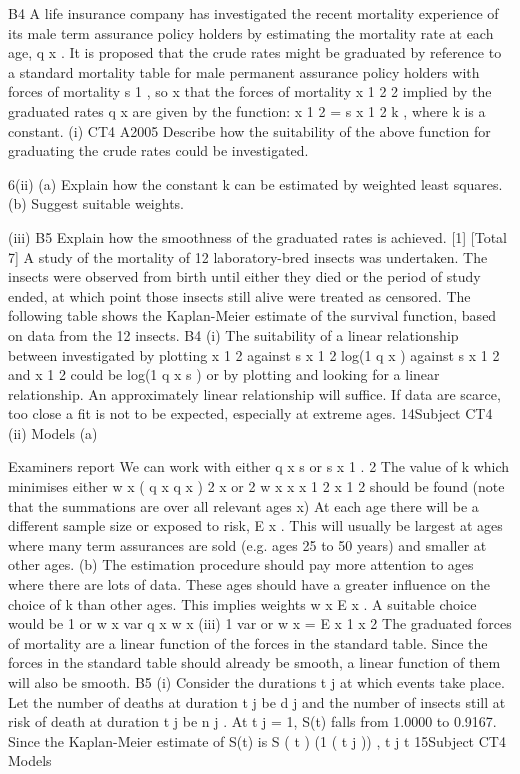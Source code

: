 \documentclass[a4paper,12pt]{article}
\begin{document}
\begin{enumerate}
B4
A life insurance company has investigated the recent mortality experience of its male
term assurance policy holders by estimating the mortality rate at each age, q x . It is
proposed that the crude rates might be graduated by reference to a standard mortality
table for male permanent assurance policy holders with forces of mortality s 1 , so
x
that the forces of mortality
x
1
2
2
implied by the graduated rates q x are given by the
function:
x
1
2
=
s
x
1
2
k ,
where k is a constant.
(i)
CT4 A2005
Describe how the suitability of the above function for graduating the crude
rates could be investigated.

6(ii)
(a) Explain how the constant k can be estimated by weighted least squares.
(b) Suggest suitable weights.

(iii)
B5
Explain how the smoothness of the graduated rates is achieved.
[1]
[Total 7]
A study of the mortality of 12 laboratory-bred insects was undertaken. The insects
were observed from birth until either they died or the period of study ended, at which
point those insects still alive were treated as censored.
The following table shows the Kaplan-Meier estimate of the survival function, based
on data from the 12 insects.
B4
(i)
The suitability of a linear relationship between
investigated by plotting
x
1
2
against
s
x
1
2
log(1 q x ) against
s
x
1
2
and
x
1
2
could be
log(1 q x s ) or by plotting
and
looking for a linear relationship.
An approximately linear relationship will suffice.
If data are scarce, too close a fit is not to be expected, especially at extreme
ages.
14Subject CT4
(ii)
Models
(a)

Examiners report
We can work with either q x s or
s
x
1 .
2
The value of k which minimises either
w x ( q x q x ) 2
x
or
2
w x
x
x
1
2
x
1
2
should be found (note that the summations are over all relevant ages x)
At each age there will be a different sample size or exposed to risk, E x .
This will usually be largest at ages where many term assurances are
sold (e.g. ages 25 to 50 years) and smaller at other ages.
(b)
The estimation procedure should pay more attention to ages where
there are lots of data. These ages should have a greater influence on
the choice of k than other ages.
This implies weights w x E x .
A suitable choice would be
1
or w x
var q x
w x
(iii)
1
var
or w x = E x
1
x
2
The graduated forces of mortality are a linear function of the forces in the
standard table.
Since the forces in the standard table should already be smooth, a linear
function of them will also be smooth.
B5
(i)
Consider the durations t j at which events take place.
Let the number of deaths at duration t j be d j and the number of insects still at
risk of death at duration t j be n j .
At t j = 1, S(t) falls from 1.0000 to 0.9167.
Since the Kaplan-Meier estimate of S(t) is
S ( t )
(1
( t j )) ,
t j t
15Subject CT4
Models


\end{enumerate}
\end{document}
